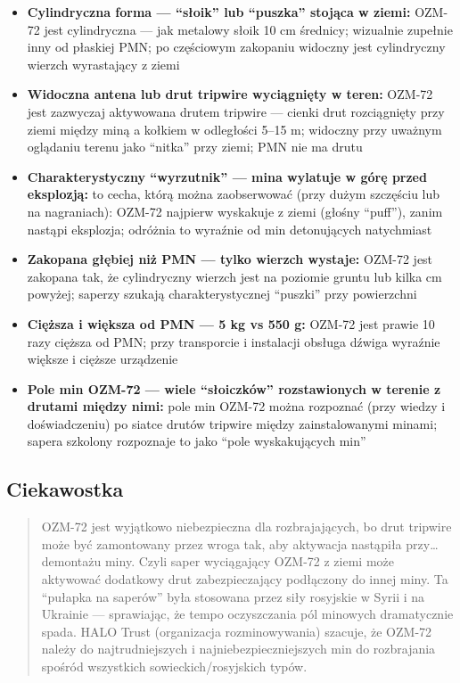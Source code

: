 \documentclass[12pt,oneside]{book}
\providecommand{\tightlist}{%
  \setlength{\itemsep}{0pt}\setlength{\parskip}{0pt}}
\begin{document}
\begin{itemize}
\tightlist
\item
  \textbf{Cylindryczna forma --- ``słoik'' lub ``puszka'' stojąca w
  ziemi:} OZM-72 jest cylindryczna --- jak metalowy słoik 10 cm
  średnicy; wizualnie zupełnie inny od płaskiej PMN; po częściowym
  zakopaniu widoczny jest cylindryczny wierzch wyrastający z ziemi
\item
  \textbf{Widoczna antena lub drut tripwire wyciągnięty w teren:} OZM-72
  jest zazwyczaj aktywowana drutem tripwire --- cienki drut rozciągnięty
  przy ziemi między miną a kołkiem w odległości 5--15 m; widoczny przy
  uważnym oglądaniu terenu jako ``nitka'' przy ziemi; PMN nie ma drutu
\item
  \textbf{Charakterystyczny ``wyrzutnik'' --- mina wylatuje w górę przed
  eksplozją:} to cecha, którą można zaobserwować (przy dużym szczęściu
  lub na nagraniach): OZM-72 najpierw wyskakuje z ziemi (głośny
  ``puff''), zanim nastąpi eksplozja; odróżnia to wyraźnie od min
  detonujących natychmiast
\item
  \textbf{Zakopana głębiej niż PMN --- tylko wierzch wystaje:} OZM-72
  jest zakopana tak, że cylindryczny wierzch jest na poziomie gruntu lub
  kilka cm powyżej; saperzy szukają charakterystycznej ``puszki'' przy
  powierzchni
\item
  \textbf{Cięższa i większa od PMN --- 5 kg vs 550 g:} OZM-72 jest
  prawie 10 razy cięższa od PMN; przy transporcie i instalacji obsługa
  dźwiga wyraźnie większe i cięższe urządzenie
\item
  \textbf{Pole min OZM-72 --- wiele ``słoiczków'' rozstawionych w
  terenie z drutami między nimi:} pole min OZM-72 można rozpoznać (przy
  wiedzy i doświadczeniu) po siatce drutów tripwire między
  zainstalowanymi minami; sapera szkolony rozpoznaje to jako ``pole
  wyskakujących min''
\end{itemize}

\subsection{Ciekawostka}\label{ciekawostka-124}

\begin{quote}
OZM-72 jest wyjątkowo niebezpieczna dla rozbrajających, bo drut tripwire
może być zamontowany przez wroga tak, aby aktywacja nastąpiła
przy\ldots{} demontażu miny. Czyli saper wyciągający OZM-72 z ziemi może
aktywować dodatkowy drut zabezpieczający podłączony do innej miny. Ta
``pułapka na saperów'' była stosowana przez siły rosyjskie w Syrii i na
Ukrainie --- sprawiając, że tempo oczyszczania pól minowych dramatycznie
spada. HALO Trust (organizacja rozminowywania) szacuje, że OZM-72 należy
do najtrudniejszych i najniebezpieczniejszych min do rozbrajania spośród
wszystkich sowieckich/rosyjskich typów.
\end{quote}
\end{document}
